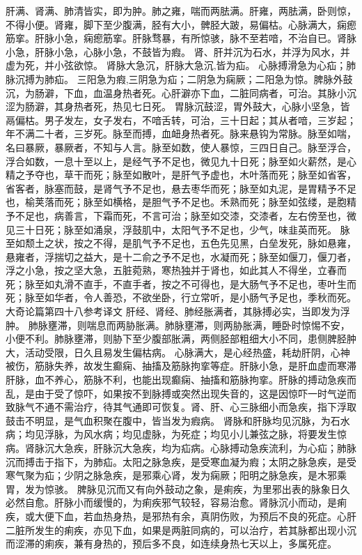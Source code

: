 \documentclass[a4paper,12pt,UTF8,twoside]{ctexbook}
\begin{document}
肝满、肾满、肺清皆实，即为肿。肺之雍，喘而两胠满。肝雍，两胠满，卧则惊，不得小便。肾雍，脚下至少腹满，胫有大小，髀胫大跛，易偏枯。心脉满大，痫瘛筋挛。肝脉小急，痫瘛筋挛。肝脉骛暴，有所惊骇，脉不至若喑，不治自已。肾脉小急，肝脉小急，心脉小急，不鼓皆为瘕。
肾、肝并沉为石水，并浮为风水，并虚为死，并小弦欲惊。
肾脉大急沉，肝脉大急沉,皆为疝。
心脉搏滑急为心疝；肺脉沉搏为肺疝。
三阳急为瘕,三阴急为疝；二阴急为痫厥；二阳急为惊。脾脉外鼓沉，为肠澼，下血，血温身热者死。心肝澼亦下血，二脏同病者，可治。其脉小沉涩为肠澼，其身热者死，热见七日死。
胃脉沉鼓涩，胃外鼓大，心脉小坚急，皆鬲偏枯。男子发左，女子发右，不喑舌转，可治，三十日起；其从者喑，三岁起；年不满二十者，三岁死。脉至而搏，血衄身热者死。脉来悬钩为常脉。脉至如喘，名曰暴厥，暴厥者，不知与人言。脉至如数，使人暴惊，三四日自己。脉至浮合，浮合如数，一息十至以上，是经气予不足也，微见九十日死；脉至如火薪然，是心精之予夺也，草干而死；脉至如散叶，是肝气予虚也，木叶落而死；脉至如省客，省客者，脉塞而鼓，是肾气予不足也，悬去枣华而死；脉至如丸泥，是胃精予不足也，榆荚落而死；脉至如横格，是胆气予不足也。禾熟而死；脉至如弦缕，是胞精予不足也，病善言，下霜而死，不言可治；脉至如交漆，交漆者，左右傍至也，微见三十日死；脉至如涌泉，浮鼓肌中，太阳气予不足也，少气，味韭英而死。
脉至如颓土之状，按之不得，是肌气予不足也，五色先见黑，白垒发死，脉如悬雍，悬雍者，浮揣切之益大，是十二俞之予不足也，水凝而死；脉至如偃刀，偃刀者，浮之小急，按之坚大急，五脏菀熟，寒热独并于肾也，如此其人不得坐，立春而死；脉至如丸滑不直手，不直手者，按之不可得也，是大肠气予不足也，枣叶生而死；脉至如华者，令人善恐，不欲坐卧，行立常听，是小肠气予足也，季秋而死。
大奇论篇第四十八参考译文
肝经、肾经、肺经胀满者，其脉搏必实，当即发为浮肿。
肺脉壅滞，则喘息而两胁胀满。肺脉壅滞，则两胁胀满，睡卧时惊惕不安，小便不利。肺脉壅滞，则胁下至少腹部胀满，两侧胫部粗细大小不同，患侧脾胫肿大，活动受限，日久且易发生偏枯病。
心脉满大，是心经热盛，耗劫肝阴，心神被伤，筋脉失养，故发生癫痫、抽搐及筋脉拘挛等症。肝脉小急，是肝血虚而寒滞肝脉，血不养心，筋脉不利，也能出现癫痫、抽搐和筋脉拘挛。肝脉的搏动急疾而乱，是由于受了惊吓，如果按不到脉搏或突然出现失音的，这是因惊吓一时气逆而致脉气不通不需治疗，待其气通即可恢复。肾、肝、心三脉细小而急疾，指下浮取鼓击不明显，是气血积聚在腹中，皆当发为瘕病。
肾脉和肝脉均见沉脉，为石水病；均见浮脉，为风水病；均见虚脉，为死症；均见小儿兼弦之脉，将要发生惊病。肾脉沉大急疾，肝脉沉大急疾，均为疝病。心脉搏动急疾流利，为心疝；肺脉沉而搏击于指下，为肺疝。太阳之脉急疾，是受寒血凝为瘕；太阴之脉急疾，是受寒气聚为疝；少阴之脉急疾，是邪乘心肾，发为痫厥；阳明之脉急疾，是木邪乘胃，发为惊骇。
脾脉见沉而又有向外鼓动之象，是痢疾，为里邪出表的脉象日久必然自愈。肝脉小而缓慢的，为痢疾邪气较轻，容易治愈。肾脉沉小而动，是痢疾，或大便下血，若血热身热，是邪热有余，真阴伤败，为预后不良的死症。心肝二脏所发生的痢疾，亦见下血，如果是两脏同病的，可以治疗，若其脉都出现小沉而涩滞的痢疾，兼有身热的，预后多不良，如连续身热七天以上，多属死症。
\end{document}
